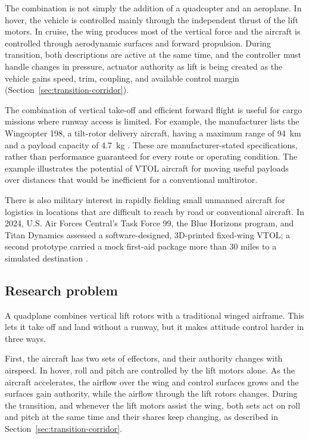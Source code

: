\documentclass{article}
\begin{document}
The combination is not simply the addition of a quadcopter and an aeroplane. In hover, the vehicle is controlled mainly through the independent thrust of the lift motors. In cruise, the wing produces most of the vertical force and the aircraft is controlled through aerodynamic surfaces and forward propulsion. During transition, both descriptions are active at the same time, and the controller must handle changes in pressure, actuator authority as lift is being created as the vehicle gains speed, trim, coupling, and available control margin (Section~\ref{sec:transition-corridor}). 

The combination of vertical take-off and efficient forward flight is useful for cargo missions where runway access is limited. For example, the manufacturer lists the Wingcopter 198, a tilt-rotor delivery aircraft, having a maximum range of \SI{94}{\kilo\meter} and a payload capacity of \SI{4.7}{\kilogram} \citep{wingcopter198}. These are manufacturer-stated specifications, rather than performance guaranteed for every route or operating condition. The example illustrates the potential of VTOL aircraft for moving useful payloads over distances that would be inefficient for a conventional multirotor.

There is also military interest in rapidly fielding small unmanned aircraft for logistics in locations that are difficult to reach by road or conventional aircraft. In 2024, U.S. Air Forces Central's Task Force 99, the Blue Horizons program, and Titan Dynamics assessed a software-designed, 3D-printed fixed-wing VTOL; a second prototype carried a mock first-aid package more than 30 miles to a simulated destination \citep{vermeulen2024taskforce99}.


\subsection{Research problem}
\label{sec:research-problem}

A quadplane combines vertical lift rotors with a traditional winged airframe. This lets it take off and land without a runway, but it makes attitude control harder in three ways.

First, the aircraft has two sets of effectors, and their authority changes with airspeed. In hover, roll and pitch are controlled by the lift motors alone. As the aircraft accelerates, the airflow over the wing and control surfaces grows and the surfaces gain authority, while the airflow through the lift rotors changes. During the transition, and whenever the lift motors assist the wing, both sets act on roll and pitch at the same time and their shares keep changing, as described in Section~\ref{sec:transition-corridor}.
\end{document}
